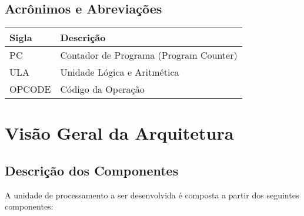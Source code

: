 \documentclass{report}
\begin{document}
  \section{Acrônimos e Abreviações}
    \FloatBarrier
    \begin{table}[H]
      \begin{center}
        \begin{tabular}[pos]{|m{2cm} | m{12cm}|} 
          \hline
          \cellcolor[gray]{0.9}\textbf{Sigla} & \cellcolor[gray]{0.9}\textbf{Descrição} \\ \hline
             PC       &  Contador de Programa (Program Counter)\\ \hline
             ULA      &  Unidade Lógica e Aritmética\\ \hline
             OPCODE   &  Código da Operação\\ \hline
        \end{tabular}
      \end{center}
    \end{table}  

\chapter{Visão Geral da Arquitetura}

  \section{Descrição dos Componentes}
  A unidade de processamento a ser desenvolvida é composta a partir dos seguintes componentes:
  
\end{document}

